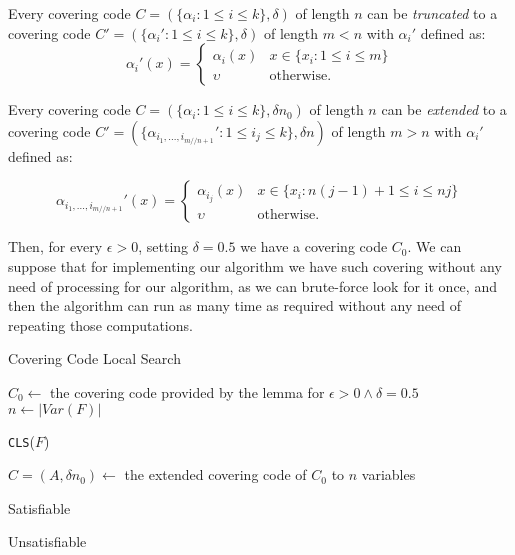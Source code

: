 \begin{remark}
  Every covering code $C = (\{\alpha_i : 1 \le i \le k\},\delta)$ of length $n$ can be \emph{truncated} to a covering code $C' = (\{\alpha_i' : 1 \le i \le k\},\delta)$ of length $m < n$  with $\alpha_i'$ defined as:
  $$
\alpha_i'(x)=
\begin{cases}
  \alpha_i(x) & x \in \{x_i:1\le i \le m\}\\
  \upsilon& \text{otherwise}.
\end{cases}
$$


\end{remark}

\begin{remark}
  Every covering code  $C = (\{\alpha_i : 1 \le i \le k\},\delta n_0)$ of length $n$ can be \emph{extended} to a covering code $C' = (\{\alpha_{i_1,...,i_{m//n+1}}' : 1 \le i_j \le k \},\delta n)$ of length $m > n$  with $\alpha_i'$ defined as:

  $$
\alpha_{i_1,...,i_{m//n+1}}'(x)=
\begin{cases}
  \alpha_{i_j}(x) & x \in \{x_i:n(j-1)+1\le i \le nj\}\\
  \upsilon& \text{otherwise}.
\end{cases}
$$

\end{remark}

Then, for every $\epsilon >0$, setting $\delta = 0.5$ we have a covering code $C_0$. We can suppose that for implementing our algorithm we have such covering without any need of processing for our algorithm, as we can brute-force look for it once, and then the algorithm can run as many time as required without any need of repeating those computations. 



\begin{algorithm}
  \caption{Covering Code Local Search}\label{ccls}
\begin{algorithmic}[1]
  \State $C_0 \gets $ the covering code provided by the lemma for $\epsilon > 0\land \delta = 0.5$ 
  \State $n \gets |Var(F)|$

   \Return \texttt{CLS}($F$)
  \EndIf 

  \State $C=(A,\delta n_0) \gets $ the extended covering code of $C_0$ to $n$ variables

   \Return Satisfiable
  \EndIf
  \EndFor

  \State \Return Unsatisfiable
  \EndProcedure	
\end{algorithmic}
\end{algorithm}

